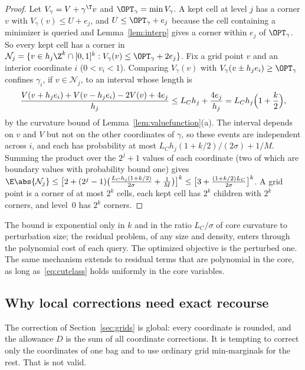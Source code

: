 \begin{proof}
Let $V_\gamma=V+\gamma^\T v$ and $\OPT_\gamma=\min V_\gamma$. A kept cell at
level $j$ has a corner $v$ with $V_\gamma(v)\le U+e_j$, and $U\le\OPT_\gamma+e_j$
because the cell containing a minimizer is queried and
Lemma~\ref{lem:interp} gives a corner within $e_j$ of $\OPT_\gamma$. So every
kept cell has a corner in
$\mathcal N_j=\{v\in h_j\Z^k\cap[0,1]^k:V_\gamma(v)\le\OPT_\gamma+2e_j\}$.
Fix a grid point $v$ and an interior coordinate $i$ ($0<v_i<1$). Comparing
$V_\gamma(v)$ with $V_\gamma(v\pm h_je_i)\ge\OPT_\gamma$ confines $\gamma_i$, if
$v\in\mathcal N_j$, to an interval whose length is
\[
\frac{V(v+h_je_i)+V(v-h_je_i)-2V(v)+4e_j}{h_j}\le L_Ch_j+\frac{4e_j}{h_j}
=L_Ch_j\Bigl(1+\frac k2\Bigr),
\]
by the curvature bound of Lemma~\ref{lem:valuefunction}(a). The interval
depends on $v$ and $V$ but not on the other coordinates of $\gamma$, so these
events are independent across $i$, and each has probability at most
$L_Ch_j(1+k/2)/(2\sigma)+1/M$. Summing the product over the $2^j+1$ values of
each coordinate (two of which are boundary values with probability bound
one) gives
$\E\abs{\mathcal N_j}\le\bigl[2+(2^j-1)\bigl(\frac{L_Ch_j(1+k/2)}{2\sigma}+\frac1M\bigr)\bigr]^k
\le\bigl[3+\frac{(1+k/2)L_C}{2\sigma}\bigr]^k$. A grid point is a corner of at
most $2^k$ cells, each kept cell has $2^k$ children with $2^k$ corners, and
level~$0$ has $2^k$ corners.
\end{proof}

The bound is exponential only in $k$ and in the ratio $L_C/\sigma$ of core
curvature to perturbation size; the residual problem, of any size and
density, enters through the polynomial cost of each query. The optimized
objective is the perturbed one. The same mechanism extends to residual
terms that are polynomial in the core, as long as~\eqref{eq:cutclass} holds
uniformly in the core variables.

\subsection{Why local corrections need exact recourse}\label{sec:local}
The correction of Section~\ref{sec:grids} is global: every coordinate is
rounded, and the allowance $D$ is the sum of all coordinate corrections.
It is tempting to correct only the coordinates of one bag and to use
ordinary grid min-marginals for the rest. That is not valid.

